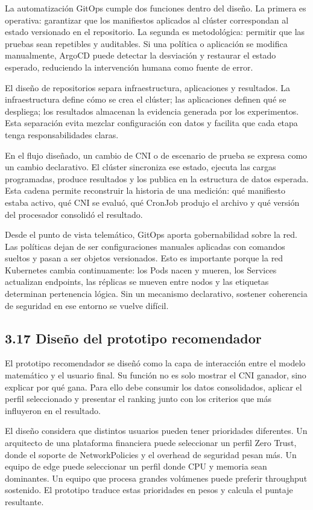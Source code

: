 La automatización GitOps cumple dos funciones dentro del diseño. La primera es operativa: garantizar que los manifiestos aplicados al clúster correspondan al estado versionado en el repositorio. La segunda es metodológica: permitir que las pruebas sean repetibles y auditables. Si una política o aplicación se modifica manualmente, ArgoCD puede detectar la desviación y restaurar el estado esperado, reduciendo la intervención humana como fuente de error.

El diseño de repositorios separa infraestructura, aplicaciones y resultados. La infraestructura define cómo se crea el clúster; las aplicaciones definen qué se despliega; los resultados almacenan la evidencia generada por los experimentos. Esta separación evita mezclar configuración con datos y facilita que cada etapa tenga responsabilidades claras.

En el flujo diseñado, un cambio de CNI o de escenario de prueba se expresa como un cambio declarativo. El clúster sincroniza ese estado, ejecuta las cargas programadas, produce resultados y los publica en la estructura de datos esperada. Esta cadena permite reconstruir la historia de una medición: qué manifiesto estaba activo, qué CNI se evaluó, qué CronJob produjo el archivo y qué versión del procesador consolidó el resultado.

Desde el punto de vista telemático, GitOps aporta gobernabilidad sobre la red. Las políticas dejan de ser configuraciones manuales aplicadas con comandos sueltos y pasan a ser objetos versionados. Esto es importante porque la red Kubernetes cambia continuamente: los Pods nacen y mueren, los Services actualizan endpoints, las réplicas se mueven entre nodos y las etiquetas determinan pertenencia lógica. Sin un mecanismo declarativo, sostener coherencia de seguridad en ese entorno se vuelve difícil.

\subsection{3.17 Diseño del prototipo recomendador}

El prototipo recomendador se diseñó como la capa de interacción entre el modelo matemático y el usuario final. Su función no es solo mostrar el CNI ganador, sino explicar por qué gana. Para ello debe consumir los datos consolidados, aplicar el perfil seleccionado y presentar el ranking junto con los criterios que más influyeron en el resultado.

El diseño considera que distintos usuarios pueden tener prioridades diferentes. Un arquitecto de una plataforma financiera puede seleccionar un perfil Zero Trust, donde el soporte de NetworkPolicies y el overhead de seguridad pesan más. Un equipo de edge puede seleccionar un perfil donde CPU y memoria sean dominantes. Un equipo que procesa grandes volúmenes puede preferir throughput sostenido. El prototipo traduce estas prioridades en pesos y calcula el puntaje resultante.


